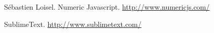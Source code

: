 \documentclass[12pt]{report}
\theoremstyle{definition}
\begin{document}
\begin{thebibliography}{99}
		Sébastien Loisel.
		Numeric Javascript. 
		\url{http://www.numericjs.com/}	
		
		SublimeText.
		\url{http://www.sublimetext.com/}
		

		
		
		
		
		
		
		
		
	\end{thebibliography}	
	
\end{document}
